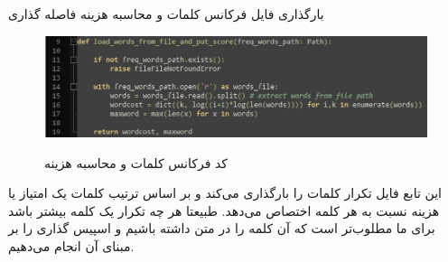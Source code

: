 \SubProblem
{بارگذاری فایل فرکانس کلمات و محاسبه هزینه فاصله گذاری}
{
\begin{figure}[H]
    \centering
    \includegraphics[width=15cm]{Images/F1.jpg}
    \label{fig:label}
    \caption{کد فرکانس کلمات و محاسبه هزینه}
\end{figure}

این تابع فایل تکرار کلمات را بارگذاری می‌کند و بر اساس ترتیب کلمات یک امتیاز یا هزینه نسبت به هر کلمه اختصاص می‌دهد. طبیعتا هر چه تکرار یک کلمه بیشتر باشد برای ما مطلوب‌تر است که آن کلمه را در متن داشته باشیم و اسپیس گذاری را بر مبنای آن انجام می‌دهیم.
}
